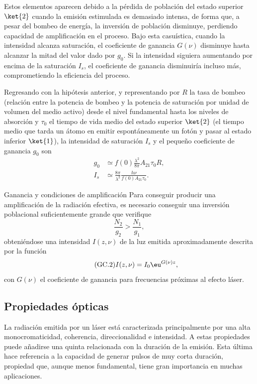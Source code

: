 Estos elementos aparecen debido a la pérdida de población del estado superior $\ket{2}$ cuando la emisión estimulada es demasiado intensa, de forma que, a pesar del bombeo de energía, la inversión de población disminuye, perdiendo capacidad de amplificación en el proceso. Bajo esta casuística, cuando la intensidad alcanza saturación, el coeficiente de ganancia $G(\nu)$ disminuye hasta alcanzar la mitad del valor dado por $g_{0}$. Si la intensidad siguiera aumentando por encima de la saturación $I_{s}$, el coeficiente de ganancia disminuiría incluso más, comprometiendo la eficiencia del proceso. 

Regresando con la hipótesis anterior, y representando por $R$ la tasa de bombeo (relación entre la potencia de bombeo y la potencia de saturación por unidad de volumen del medio activo) desde el nivel fundamental hasta los niveles de absorción y $\tau_{0}$ el tiempo de vida medio del estado superior $\ket{2}$ (el tiempo medio que tarda un átomo en emitir espontáneamente un fotón y pasar al estado inferior $\ket{1}$), la intensidad de saturación $I_{s}$ y el pequeño coeficiente de ganancia $g_{0}$ son
\begin{align}
  \label{1.23a}
  g_{0} &\simeq f(0)\frac{\lambda^{2}}{8 \pi}A_{21} \tau_{0}R, \\
  \label{1.23b}
  I_{s} &\simeq \frac{8 \pi}{\lambda^{2}}\frac{h \nu}{f(0)A_{21} \tau_{0}}.
\end{align}

\begin{footheorem*}{Ganancia y condiciones de amplificación}
    Para conseguir producir una amplificación de la radiación efectiva, es necesario conseguir una inversión poblacional suficientemente grande que verifique
    \begin{equation}
      \tag{GC.1}
      \frac{N_{2}}{g_{2}} > \frac{N_{1}}{g_{1}},
    \end{equation}
    obteniéndose una intensidad $I(z,\nu)$ de la luz emitida aproximadamente descrita por la función
    \begin{equation}
      \tag{GC.2}
      I(z,\nu) = I_{0}\eu^{G(\nu)z},
    \end{equation}
    con $G(\nu)$ el coeficiente de ganancia para frecuencias próximas al efecto láser.
\end{footheorem*}

\subsection{Propiedades ópticas}\label{sec:1.1.2}
La radiación emitida por un láser está caracterizada principalmente por una alta monocromaticidad, coherencia, direccionalidad e intensidad. A estas propiedades puede añadirse una quinta relacionada con la duración de la emisión\autocite{Svelto2010}. Esta última hace referencia a la capacidad de generar pulsos de muy corta duración, propiedad que, aunque menos fundamental, tiene gran importancia en muchas aplicaciones. 

